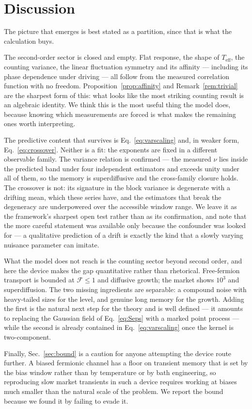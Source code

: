 \documentclass[aps,pre,twocolumn,superscriptaddress,floatfix,nofootinbib]{revtex4-2}
\newcommand{\Teff}{T_{\mathrm{eff}}}
\begin{document}
\section{Discussion}

The picture that emerges is best stated as a partition, since that is what the
calculation buys.

The second-order sector is closed and empty. Flat response, the shape of
$\Teff$, the counting variance, the linear fluctuation symmetry and its affinity
--- including its phase dependence under driving --- all follow from the measured
correlation function with no freedom. Proposition~\ref{prop:affinity} and
Remark~\ref{rem:trivial} are the sharpest form of this: what looks like the most
striking counting result is an algebraic identity. We think this is the most
useful thing the model does, because knowing which measurements are forced is
what makes the remaining ones worth interpreting.

The predictive content that survives is Eq.~\eqref{eq:varscaling} and, in
weaker form, Eq.~\eqref{eq:crossover}. Neither is a fit: the exponents are
fixed in a different observable family. The variance relation is confirmed ---
the measured $\nu$ lies inside the predicted band under four independent
estimators and exceeds unity under all of them, so the memory is superdiffusive
and the cross-family closure holds. The crossover is not: its signature in the
block variance is degenerate with a drifting mean, which these series have, and
the estimators that break the degeneracy are underpowered over the accessible
window range. We leave it as the framework's sharpest open test rather than as
its confirmation, and note that the more careful statement was available only
because the confounder was looked for --- a qualitative prediction of a drift
is exactly the kind that a slowly varying nuisance parameter can imitate.

What the model does not reach is the counting sector beyond second order, and
here the device makes the gap quantitative rather than rhetorical. Free-fermion
transport is bounded at $\mathcal{F}\le1$ and diffusive growth; the market shows
$10^3$ and superdiffusion. The two missing ingredients are separable: a compound
noise with heavy-tailed sizes for the level, and genuine long memory for the
growth. Adding the first is the natural next step for the theory and is well
defined --- it amounts to replacing the Gaussian field of Eq.~\eqref{eq:Seps}
with a marked point process --- while the second is already contained in
Eq.~\eqref{eq:varscaling} once the kernel is two-component.

Finally, Sec.~\ref{sec:bound} is a caution for anyone attempting the device route
further. A biased fermionic channel has a floor on transient memory that is set
by the bias window rather than by temperature or by bath engineering, so
reproducing slow market transients in such a device requires working at biases
much smaller than the natural scale of the problem. We report the bound because
we found it by failing to evade it.

\begin{acknowledgments}
\end{acknowledgments}


\end{document}
